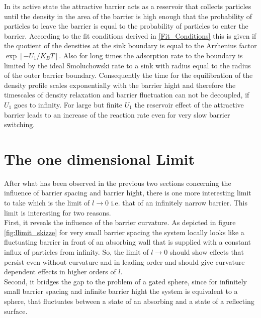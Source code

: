 In its active state the attractive barrier acts as a reservoir that collects particles until the density in the area of the barrier is high enough that the probability of particles to leave the barrier is equal to the probability of particles to enter the barrier. According to the fit conditions derived in \ref{Fit_Conditions} this is given if the quotient of the densities at the sink boundary is equal to the Arrhenius factor $\exp[-U_1/K_B T]$. Also for long times the adsorption rate to the boundary is limited by the ideal Smoluchowski rate to a sink with radius equal to the radius of the outer barrier boundary. Consequently the time for the equilibration of the density profile scales exponentially with the barrier hight and therefore the timescales of density relaxation and barrier fluctuation can not be decoupled, if $U_1$ goes to infinity. For large but finite $U_1$ the reservoir effect of the attractive barrier leads to an increase of the reaction rate even for very slow barrier switching.
\newpage
\section{The one dimensional Limit}
After what has been observed in the previous two sections concerning the influence of barrier spacing and barrier hight, there is one more interesting limit to take which is the limit of $l \rightarrow 0$ i.e. that of an infinitely narrow barrier. This limit is interesting for two reasons. \\
First, it reveals the influence of the barrier curvature. As depicted in figure \ref{fig:llimit_skizze} for very small barrier spacing the system locally looks like a fluctuating barrier in front of an absorbing wall that is supplied with a constant influx of particles from infinity. So, the limit of $l \rightarrow 0$ should show effects that persist even without curvature and in leading order and should give curvature dependent effects in higher orders of $l$.\\
Second, it bridges the gap to the problem of a gated sphere, since for infinitely small barrier spacing and infinite barrier hight the system is equivalent to a sphere, that fluctuates between a state of an absorbing and a state of a reflecting surface.
\\ \vspace{-1 cm}

